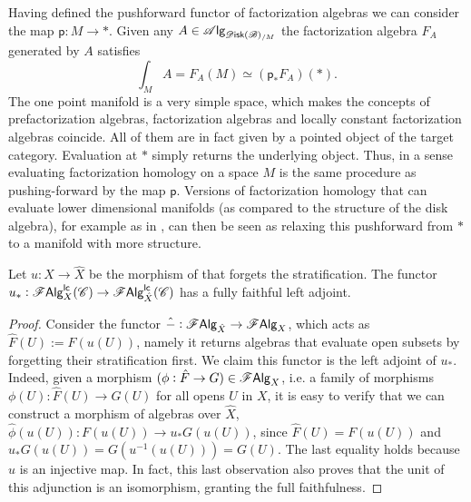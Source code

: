 \documentclass[../text]{subfiles}
\begin{document}
\begin{remark}\label{rem:fh_is_pushingforward}
    Having defined the pushforward functor of factorization algebras we can consider the map $\mathsf{p}:M \rightarrow *$. Given any $A \in \alg{\disk(\bstr)_{/M}}$ the factorization algebra $F_A$ generated by $A$ satisfies
    \begin{equation}
        \int_M A  = F_A(M) \simeq (\mathsf{p}_* F_A)(*).
    \end{equation}
    The one point manifold is a very simple space, which makes the concepts of prefactorization algebras, factorization algebras and locally constant factorization algebras coincide. All of them are in fact given by a pointed object of the target category. Evaluation at $*$ simply returns the underlying object. Thus, in a sense evaluating factorization homology on a space $M$ is the same procedure as pushing-forward by the map $\mathsf{p}$. Versions of factorization homology that can evaluate lower dimensional manifolds (as compared to the structure of the disk algebra), for example as in \cite[cor.2.29]{aft_fhstrat}, can then be seen as relaxing this pushforward from $*$ to a manifold with more structure.
\end{remark} 

\begin{lemma}\label{lem:ff_functor_to_refinement}
    Let $u: X \rightarrow \hat{X}$ be the morphism of  that forgets the stratification.
    The functor $u_*: \mathscr{F} \mathsf{Alg}^{\mathsf{lc}}_{X} (\mathscr{C}) \rightarrow \mathscr{F} \mathsf{Alg}^{\mathsf{lc}}_{\hat{X}} (\mathscr{C})$ has a fully faithful left adjoint.
\end{lemma}

\begin{proof}
    Consider the functor $\hat{-}: \mathscr{F} \mathsf{Alg}_{\hat{X}} \rightarrow \mathscr{F} \mathsf{Alg}_{X}$, which acts as $\hat{F}(U) := F(u(U))$, namely it returns algebras that evaluate open subsets by forgetting their stratification first. We claim this functor is the left adjoint of $u_*$. Indeed, given a morphism $(\phi: \hat{F} \rightarrow G) \in \mathscr{F} \mathsf{Alg}_{X}$, i.e. a family of morphisms $\phi(U): \hat{F}(U) \rightarrow G(U)$ for all opens $U$ in $X$, it is easy to verify that we can construct a morphism of algebras over $\hat{X}$, $\hat{\phi}(u(U)): F(u(U)) \rightarrow u_*G (u(U))$, since $\hat{F}(U) = F(u(U))$ and $u_*G(u(U)) = G(u^{-1}(u(U))) = G(U)$. The last equality holds because $u$ is an injective map. In fact, this last observation also proves that the unit of this adjunction is an isomorphism, granting the full faithfulness.
\end{proof}
\end{document}
